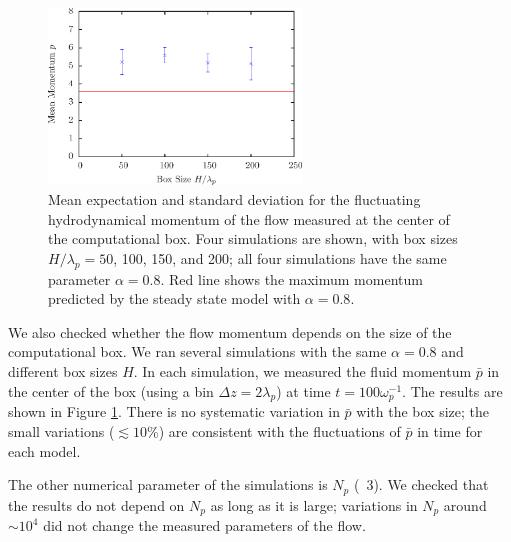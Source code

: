 \begin{figure}[h]
\begin{center}
\includegraphics[width=0.6\textwidth]{pics/chap2/f6.eps}
\caption{Mean expectation and standard deviation for the fluctuating hydrodynamical
momentum of the flow measured at the center of the computational box. Four
simulations are shown, with box sizes $H/\lambda_p=50$, 100, 150, and 200;
all four simulations have the same parameter $\alpha=0.8$. Red line shows the
maximum momentum predicted by the steady state model with $\alpha=0.8$.}
\label{fig:zetacompare}
\end{center}
\end{figure}

We also checked whether the flow momentum depends on the size of the computational
box. We ran several simulations with the same $\alpha = 0.8$ and different box sizes
$H$. In each simulation, we measured the fluid momentum $\bar{p}$ in the center of
the box (using a bin $\Delta z=2\lambda_p$) at time $t=100\omega_p^{-1}$.
The results are shown in Figure \ref{fig:zetacompare}.
There is no systematic variation in $\bar{p}$ with the box size; the small variations
($\lesssim 10$\%) are consistent with the fluctuations of $\bar{p}$ in time for each model.

The other numerical parameter of the simulations is $N_p$ (\Sect~3). We checked
that  the results do not depend on $N_p$ as long as it is large; variations in $N_p$
around $\sim 10^4$ did not change the measured parameters of the flow.



